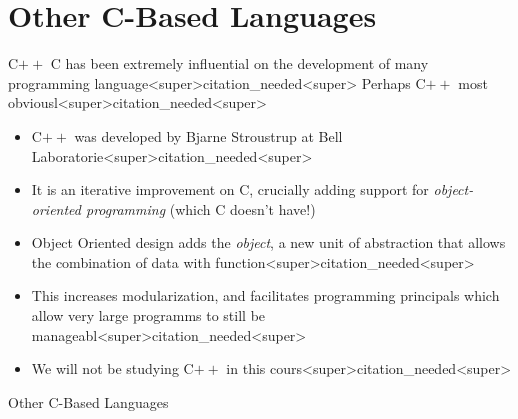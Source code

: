 \documentclass[11pt]{beamer}
\begin{document}
\section[C-Based Languages]{Other C-Based Languages}
\begin{frame}{C$++$}
C has been extremely influential on the development of many programming language<super>citation_needed<super>  Perhaps C$++$ most obviousl<super>citation_needed<super>
\begin{itemize} 
\item C$++$ was developed by Bjarne Stroustrup at Bell Laboratorie<super>citation_needed<super>
\item It is an iterative improvement on C, crucially adding support for \textit{object-oriented programming} (which C doesn't have!)
\item Object Oriented design adds the \textit{object}, a new unit of abstraction that allows the combination of data with function<super>citation_needed<super>
\item This increases modularization, and facilitates programming principals which allow very large programms to still be manageabl<super>citation_needed<super>
\item We will not be studying C$++$ in this cours<super>citation_needed<super>
\end{itemize}
\end{frame}

\begin{frame}{Other C-Based Languages} 
\end{frame}
\end{document}
